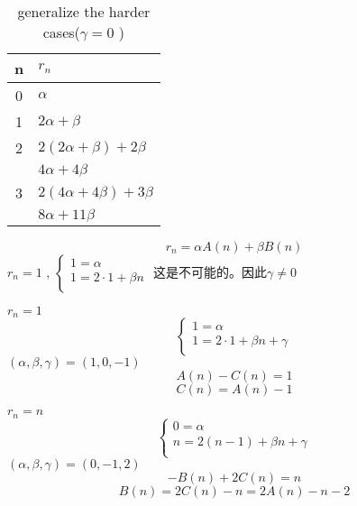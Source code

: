 \begin{table}[htbp]
	\centering
	\small
	\caption{generalize the harder cases($ \gamma = 0 $ )}
	\begin{tabular}{cl}
		\toprule
		n & $ r_n $ \\
		\midrule
        0 & $ \alpha $  \\
        1 & $ 2\alpha+\beta $  \\
        2 & $ 2(2\alpha+\beta)+2\beta $  \\
          & $ 4\alpha + 4\beta $ \\
        3 & $ 2(4\alpha + 4\beta)+3\beta $  \\
          & $ 8\alpha + 11\beta $ \\
		\bottomrule
	\end{tabular}%
	\label{tab:casesofharderChange002}%
\end{table}%
\begin{equation*}
    r_n = \alpha A(n)+\beta B(n)
\end{equation*}
$ r_n=1 $ , $ \left\{\begin{array}{l}
    1=\alpha\\
    1=2\cdot 1+\beta n\\
\end{array}\right. $ 
这是不可能的。因此$ \gamma \neq 0 $ 

$ r_n=1 $ 
\begin{equation*}
    \left\{
        \begin{array}{l}
            1=\alpha\\
            1=2\cdot 1+\beta n + \gamma\\
        \end{array}
    \right.
\end{equation*}
$ (\alpha, \beta, \gamma) = (1,0,-1) $ 
\begin{equation*}
    A(n)-C(n)=1
\end{equation*}
\begin{equation*}
    C(n)=A(n)-1    
\end{equation*}

$ r_n = n $ 
\begin{equation*}
    \left\{
        \begin{array}{l}
            0=\alpha\\
            n=2(n-1) + \beta n + \gamma\\
        \end{array}
    \right.
\end{equation*}
$ (\alpha, \beta, \gamma) = (0,-1,2) $ 
\begin{equation*}
    -B(n)+2C(n)=n
\end{equation*}
\begin{equation*}
    B(n)=2C(n)-n = 2A(n)-n-2
\end{equation*}

